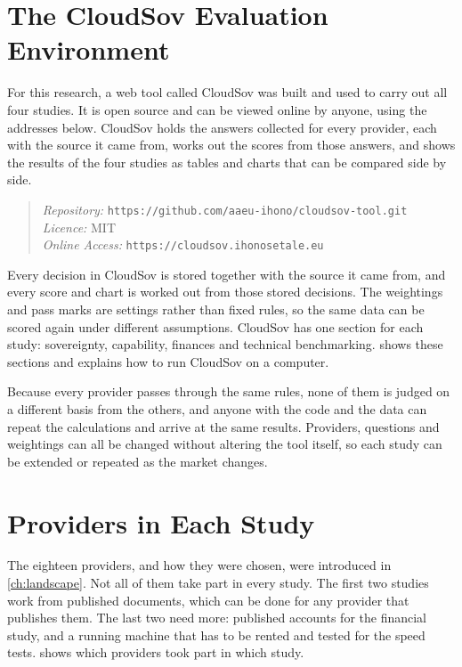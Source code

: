 \section{The CloudSov Evaluation Environment}
\label{sec:cloudsov-tool}

For this research, a web tool called CloudSov was built and used to carry out all
four studies. It is open source and can be viewed online by anyone, using the
addresses below. CloudSov holds the answers collected for every provider, each with
the source it came from, works out the scores from those answers, and shows the
results of the four studies as tables and charts that can be compared side by side.

\begin{quote}
\textit{Repository:} \texttt{https://github.com/aaeu-ihono/cloudsov-tool.git}\\
\textit{Licence:} MIT \\
\textit{Online Access:}  \texttt{https://cloudsov.ihonosetale.eu}\\
\end{quote}

Every decision in CloudSov is stored together with the source it came from, and
every score and chart is worked out from those stored decisions. The weightings and
pass marks are settings rather than fixed rules, so the same data can be scored
again under different assumptions. CloudSov has one section for each study:
sovereignty, capability, finances and technical benchmarking.  shows these
sections and explains how to run CloudSov on a computer.

Because every provider passes through the same rules, none of them is judged on a
different basis from the others, and anyone with the code and the data can repeat
the calculations and arrive at the same results. Providers, questions and weightings
can all be changed without altering the tool itself, so each study can be extended
or repeated as the market changes.

\section{Providers in Each Study}
\label{sec:study-coverage}

The eighteen providers, and how they were chosen, were introduced in
\cref{ch:landscape}. Not all of them take part in every study. The first two studies
work from published documents, which can be done for any provider that publishes
them. The last two need more: published accounts for the financial study, and a
running machine that has to be rented and tested for the speed tests.
 shows which providers took part in which study.

